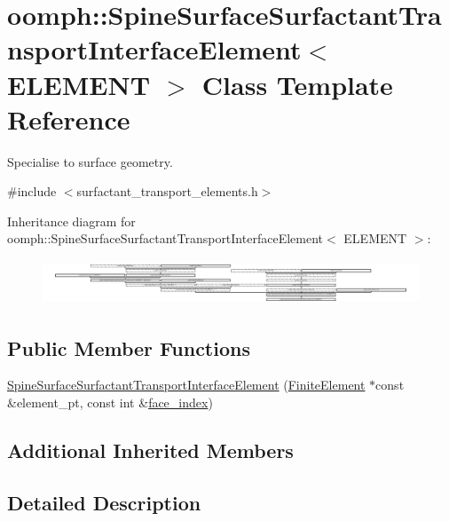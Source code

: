 \hypertarget{classoomph_1_1SpineSurfaceSurfactantTransportInterfaceElement}{}\section{oomph\+:\+:Spine\+Surface\+Surfactant\+Transport\+Interface\+Element$<$ E\+L\+E\+M\+E\+NT $>$ Class Template Reference}
\label{classoomph_1_1SpineSurfaceSurfactantTransportInterfaceElement}


Specialise to surface geometry.  




{\ttfamily \#include $<$surfactant\+\_\+transport\+\_\+elements.\+h$>$}

Inheritance diagram for oomph\+:\+:Spine\+Surface\+Surfactant\+Transport\+Interface\+Element$<$ E\+L\+E\+M\+E\+NT $>$\+:\begin{figure}[H]
\begin{center}
\leavevmode
\includegraphics[height=1.335320cm]{classoomph_1_1SpineSurfaceSurfactantTransportInterfaceElement}
\end{center}
\end{figure}
\subsection*{Public Member Functions}
\begin{DoxyCompactItemize}
\item 
\hyperlink{classoomph_1_1SpineSurfaceSurfactantTransportInterfaceElement_aa3014e796ec7e0bfa26824fc42184d06}{Spine\+Surface\+Surfactant\+Transport\+Interface\+Element} (\hyperlink{classoomph_1_1FiniteElement}{Finite\+Element} $\ast$const \&element\+\_\+pt, const int \&\hyperlink{classoomph_1_1FaceElement_a478d577ac6db67ecc80f1f02ae3ab170}{face\+\_\+index})
\end{DoxyCompactItemize}
\subsection*{Additional Inherited Members}


\subsection{Detailed Description}
